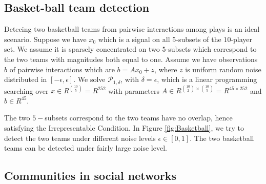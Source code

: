 \documentclass{article}
\begin{document}
\subsection{Basket-ball team detection}
Detecing two basketball teams from pairwise interactions among plays is an ideal scenario. 
Suppose we have $x_0$ which is a signal on all $5$-subsets of the $10$-player set. We assume it is sparsely
concentrated on two $5$-subsets which correspond to the two teams with magnitudes both equal to one. 
Assume we have observations $b$ of pairwise interactions which are $b=Ax_0+z$, where $z$ is uniform
random noise distributed in $[-\epsilon, \epsilon]$. We solve $\mathcal{P}_{1,\delta}$, with $\delta=\epsilon$, which is a linear programming searching over $x\in R^{10\choose 5} = R^{252}$ with parameters $A\in R^{{10\choose 2}\times{10 \choose 5}} = R^{45\times 252}$ and $b\in R^{45}$.

The two $5-$subsets correspond to the two teams have no overlap, hence satisfying the Irrepresentable Condition. In Figure \ref{fig:Basketball}, we try to detect the two teams under different noise levels $\epsilon \in [0, 1]$. The two basketball teams can be detected under fairly large noise level. 


\subsection{Communities in social networks}
\end{document}
